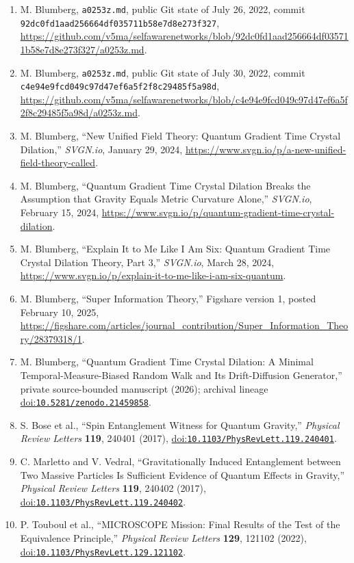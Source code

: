 \documentclass[
  american,
  11pt,
  letterpaper,
]{article}
\begin{document}
\begin{enumerate}
\item
  M. Blumberg, \texttt{a0253z.md}, public Git state of July 26, 2022, commit \nolinkurl{92dc0fd1aad256664df035711b58e7d8e273f327}, \url{https://github.com/v5ma/selfawarenetworks/blob/92dc0fd1aad256664df035711b58e7d8e273f327/a0253z.md}.
\item
  M. Blumberg, \texttt{a0253z.md}, public Git state of July 30, 2022, commit \nolinkurl{c4e94e9fcd049c97d47ef6a5f2f8c29485f5a98d}, \url{https://github.com/v5ma/selfawarenetworks/blob/c4e94e9fcd049c97d47ef6a5f2f8c29485f5a98d/a0253z.md}.
\item
  M. Blumberg, ``New Unified Field Theory: Quantum Gradient Time Crystal Dilation,'' \emph{SVGN.io}, January 29, 2024, \url{https://www.svgn.io/p/a-new-unified-field-theory-called}.
\item
  M. Blumberg, ``Quantum Gradient Time Crystal Dilation Breaks the Assumption that Gravity Equals Metric Curvature Alone,'' \emph{SVGN.io}, February 15, 2024, \url{https://www.svgn.io/p/quantum-gradient-time-crystal-dilation}.
\item
  M. Blumberg, ``Explain It to Me Like I Am Six: Quantum Gradient Time Crystal Dilation Theory, Part 3,'' \emph{SVGN.io}, March 28, 2024, \url{https://www.svgn.io/p/explain-it-to-me-like-i-am-six-quantum}.
\item
  M. Blumberg, ``Super Information Theory,'' Figshare version 1, posted February 10, 2025, \url{https://figshare.com/articles/journal_contribution/Super_Information_Theory/28379318/1}.
\item
  M. Blumberg, ``Quantum Gradient Time Crystal Dilation: A Minimal Temporal-Measure-Biased Random Walk and Its Drift-Diffusion Generator,'' private source-bounded manuscript (2026); archival lineage \href{https://doi.org/10.5281/zenodo.21459858}{doi:\nolinkurl{10.5281/zenodo.21459858}}.
\item
  S. Bose et al., ``Spin Entanglement Witness for Quantum Gravity,'' \emph{Physical Review Letters} \textbf{119}, 240401 (2017), \href{https://doi.org/10.1103/PhysRevLett.119.240401}{doi:\nolinkurl{10.1103/PhysRevLett.119.240401}}.
\item
  C. Marletto and V. Vedral, ``Gravitationally Induced Entanglement between Two Massive Particles Is Sufficient Evidence of Quantum Effects in Gravity,'' \emph{Physical Review Letters} \textbf{119}, 240402 (2017), \href{https://doi.org/10.1103/PhysRevLett.119.240402}{doi:\nolinkurl{10.1103/PhysRevLett.119.240402}}.
\item
  P. Touboul et al., ``MICROSCOPE Mission: Final Results of the Test of the Equivalence Principle,'' \emph{Physical Review Letters} \textbf{129}, 121102 (2022), \href{https://doi.org/10.1103/PhysRevLett.129.121102}{doi:\nolinkurl{10.1103/PhysRevLett.129.121102}}.
\end{enumerate}
\end{document}
